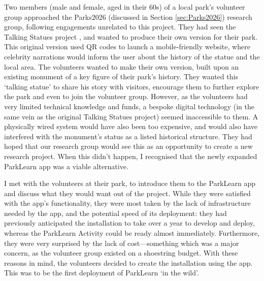 Two members (male and female, aged in their 60s) of a local park's volunteer group approached the Parks2026 (discussed in Section \ref{sec:Parks2026}) research group, following engagements unrelated to this project. They had seen the Talking Statues project \citep{Sing2017}, and wanted to produce their own version for their park. This original version used QR codes to launch a mobile-friendly website, where celebrity narrations would inform the user about the history of the statue and the local area. The volunteers wanted to make their own version, built upon an existing monument of a key figure of their park's history. They wanted this `talking statue' to share his story with visitors, encourage them to further explore the park and even to join the volunteer group. However, as the volunteers had very limited technical knowledge and funds, a bespoke digital technology (in the same vein as the original Talking Statues project) seemed inaccessible to them. A physically wired system would have also been too expensive, and would also have interfered with the monument’s status as a listed historical structure. They had hoped that our research group would see this as an opportunity to create a new research project. When this didn't happen, I recognised that the newly expanded ParkLearn app was a viable alternative.

I met with the volunteers at their park, to introduce them to the ParkLearn app and discuss what they would want out of the project. While they were satisfied with the app's functionality, they were most taken by the lack of infrastructure needed by the app, and the potential speed of its deployment: they had previously anticipated the installation to take over a year to develop and deploy, whereas the ParkLearn Activity could be ready almost immediately. Furthermore, they were very surprised by the lack of cost---something which was a major concern, as the volunteer group existed on a shoestring budget. With these reasons in mind, the volunteers decided to create the installation using the app. This was to be the first deployment of ParkLearn `in the wild'.


